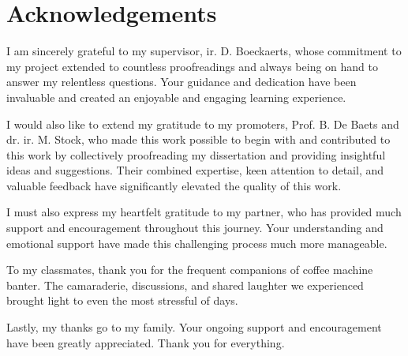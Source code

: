 \chapter{Acknowledgements}
I am sincerely grateful to my supervisor, ir. D. Boeckaerts, whose commitment to my project extended to countless proofreadings and always being on hand to answer my relentless questions. Your guidance and dedication have been invaluable and created an enjoyable and engaging learning experience.

I would also like to extend my gratitude to my promoters, Prof. B. De Baets and dr. ir. M. Stock, who made this work possible to begin with and contributed to this work by collectively proofreading my dissertation and providing insightful ideas and suggestions. Their combined expertise, keen attention to detail, and valuable feedback have significantly elevated the quality of this work.

I must also express my heartfelt gratitude to my partner, who has provided much support and encouragement throughout this journey. Your understanding and emotional support have made this challenging process much more manageable.

To my classmates, thank you for the frequent companions of coffee machine banter. The camaraderie, discussions, and shared laughter we experienced brought light to even the most stressful of days.

Lastly, my thanks go to my family. Your ongoing support and encouragement have been greatly appreciated. Thank you for everything.
